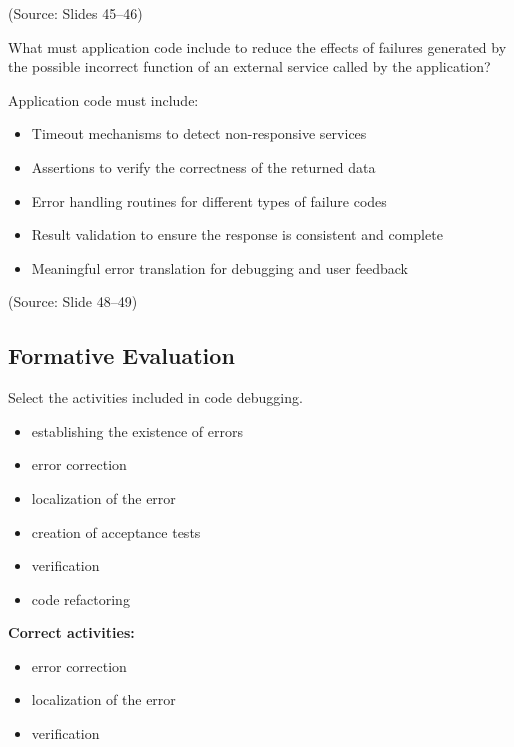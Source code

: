 \documentclass[12pt]{article}
\begin{document}
(Source: Slides 45--46)

\begin{questionbox}
What must application code include to reduce the effects of failures generated by the possible incorrect function of an external service called by the application?
\end{questionbox}

Application code must include:
\begin{itemize}
    \item Timeout mechanisms to detect non-responsive services
    \item Assertions to verify the correctness of the returned data
    \item Error handling routines for different types of failure codes
    \item Result validation to ensure the response is consistent and complete
    \item Meaningful error translation for debugging and user feedback
\end{itemize}

(Source: Slide 48--49)

\subsection{Formative Evaluation}

\begin{questionbox}
Select the activities included in code debugging.
\end{questionbox}

\begin{itemize}
    \item establishing the existence of errors
    \item error correction
    \item localization of the error
    \item creation of acceptance tests
    \item verification
    \item code refactoring
\end{itemize}

\textbf{Correct activities:}
\begin{itemize}
    \item error correction
    \item localization of the error
    \item verification
\end{itemize}
\end{document}
